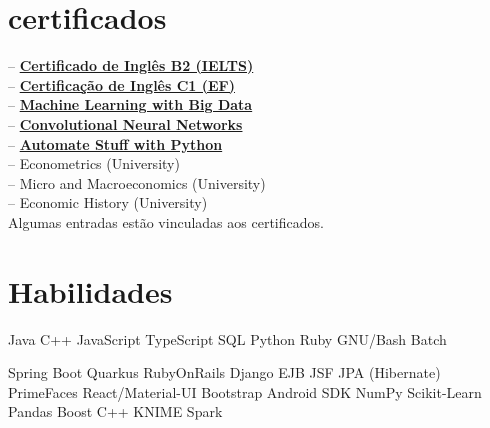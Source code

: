 \documentclass[]{CV-JuanCamiloFlorez}
\begin{document}
\begin{minipage}[t]{0.33\textwidth}
\section{certificados}
-- \textbf{\href{https://jcamilo.co/IELTS-2022.pdf}{Certificado de Inglês B2 (IELTS)}} \\
-- \textbf{\href{https://www.efset.org/cert/j8ebfw}{Certificação de Inglês C1 (EF)}} \\
-- \textbf{\href{https://www.coursera.org/account/accomplishments/certificate/8MS64GGYWDT5?utm_medium=certificate&utm_source=link&utm_campaign=copybutton_certificate}{Machine Learning with Big Data}} \\
-- \textbf{\href{https://www.coursera.org/account/accomplishments/certificate/KFN2XJC2KP92?utm_medium=certificate&utm_source=link&utm_campaign=copybutton_certificate}{Convolutional Neural Networks}} \\
-- \textbf{\href{https://www.udemy.com/certificate/UC-ZHLLMBQA}{Automate Stuff with Python}} \\
-- Econometrics (University) \\
-- Micro and Macroeconomics (University) \\
-- Economic History (University) \\
\smallskip
\scriptsize{Algumas entradas estão vinculadas aos certificados.}
\sectionsep


\section{Habilidades}
    \textbullet{} Java
    \textbullet{} C++
    \textbullet{} JavaScript
    \textbullet{} TypeScript
    \textbullet{} SQL
    \textbullet{} Python
    \textbullet{} Ruby
    \textbullet{} GNU/Bash
    \textbullet{} Batch

    \textbullet{} Spring Boot
    \textbullet{} Quarkus
    \textbullet{} RubyOnRails
    \textbullet{} Django
    \textbullet{} EJB JSF JPA (Hibernate) PrimeFaces
    \textbullet{} React/Material-UI
    \textbullet{} Bootstrap
    \textbullet{} Android SDK
    \textbullet{} NumPy
    \textbullet{} Scikit-Learn
    \textbullet{} Pandas
    \textbullet{} Boost C++
    \textbullet{} KNIME
    \textbullet{} Spark


\end{minipage}
\end{document}
